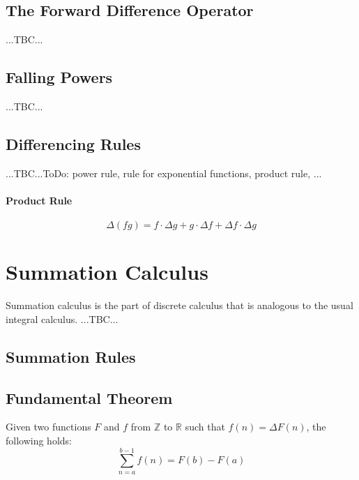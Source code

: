 \subsection{The Forward Difference Operator}  ...TBC...

\subsection{Falling Powers} ...TBC...


\subsection{Differencing Rules}  ...TBC...ToDo: power rule, rule for exponential functions, product rule, ...


\paragraph{Product Rule}
\begin{equation}
 \Delta (f g) = f \cdot \Delta g + g \cdot \Delta f + \Delta f \cdot \Delta g
\end{equation}




\section{Summation Calculus}
Summation calculus is the part of discrete calculus that is analogous to the usual integral calculus. ...TBC...

\subsection{Summation Rules}





\subsection{Fundamental Theorem}
Given two functions $F$ and $f$ from $\mathbb{Z}$ to $\mathbb{R}$ such that $f(n) = \Delta F(n)$, the following holds:
\begin{equation}
 \sum_{n=a}^{b-1} f(n) = F(b) - F(a)
\end{equation}

